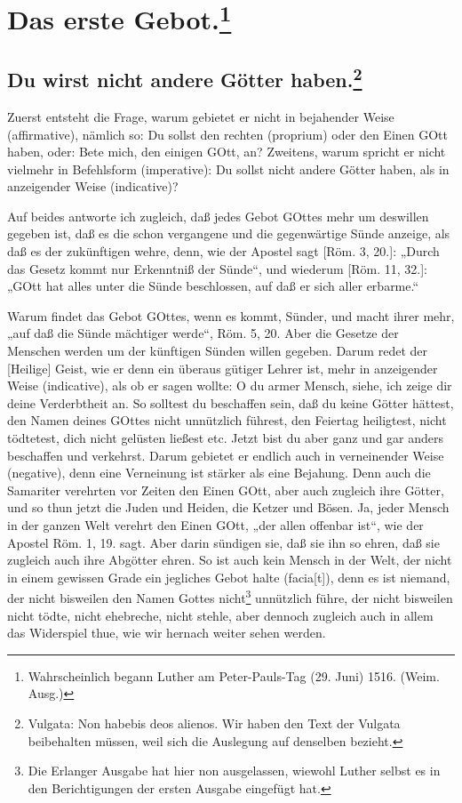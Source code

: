 \section[Das erste Gebot]{Das erste Gebot.\footnote{Wahrscheinlich begann Luther am Peter-Pauls-Tag (29. Juni) 1516. (Weim. Ausg.)}}

\subsection[Du wirst nicht andere Götter haben]{Du wirst nicht andere Götter haben.\footnote{Vulgata: Non habebis deos alienos. Wir haben den Text der Vulgata beibehalten müssen, weil sich die Auslegung auf denselben bezieht.}}

Zuerst entsteht die Frage, warum gebietet er nicht in bejahender Weise (affirmative), nämlich so: Du sollst den rechten (proprium) oder den Einen GOtt haben, oder: Bete mich, den einigen GOtt, an? Zweitens, warum spricht er nicht vielmehr in Befehlsform (imperative): Du sollst nicht andere Götter haben, als in anzeigender Weise (indicative)?

Auf beides antworte ich zugleich, daß jedes Gebot GOttes mehr um deswillen gegeben ist, daß es die schon vergangene und die gegenwärtige Sünde anzeige, als daß es der zukünftigen wehre, denn, wie der Apostel sagt [Röm. 3, 20.]: „Durch das Gesetz kommt nur Erkenntniß der Sünde“, und wiederum [Röm. 11, 32.]: „GOtt hat alles unter die Sünde beschlossen, auf daß er sich aller erbarme.“

Warum findet das Gebot GOttes, wenn es kommt, Sünder, und macht ihrer mehr, „auf daß die Sünde mächtiger werde“, Röm. 5, 20. Aber die Gesetze der Menschen werden um der künftigen Sünden willen gegeben. Darum redet der [Heilige] Geist, wie er denn ein überaus gütiger Lehrer ist, mehr in anzeigender Weise (indicative), als ob er sagen wollte: O du armer Mensch, siehe, ich zeige dir deine Verderbtheit an. So solltest du beschaffen sein, daß du keine Götter hättest, den Namen deines GOttes nicht unnützlich führest, den Feiertag heiligtest, nicht tödtetest, dich nicht gelüsten ließest etc. Jetzt bist du aber ganz und gar anders beschaffen und verkehrst. Darum gebietet er endlich auch in verneinender Weise (negative), denn eine Verneinung ist stärker als eine Bejahung. Denn auch die Samariter verehrten vor Zeiten den Einen GOtt, aber auch zugleich ihre Götter, und so thun jetzt die Juden und Heiden, die Ketzer und Bösen. Ja, jeder
Mensch in der ganzen Welt verehrt den Einen GOtt, „der allen offenbar ist“, wie der Apostel Röm. 1, 19. sagt. Aber darin sündigen sie, daß sie ihn so ehren, daß sie zugleich auch ihre Abgötter ehren. So ist auch kein Mensch in der Welt, der nicht in einem gewissen Grade ein jegliches Gebot halte (facia[t]), denn es ist niemand, der nicht bisweilen den Namen Gottes nicht\footnote{Die Erlanger Ausgabe hat hier non ausgelassen, wiewohl Luther selbst es in den Berichtigungen der ersten Ausgabe eingefügt hat.} unnützlich führe, der nicht bisweilen nicht tödte, nicht ehebreche, nicht stehle, aber dennoch zugleich auch in allem das Widerspiel thue, wie wir hernach weiter sehen werden.

